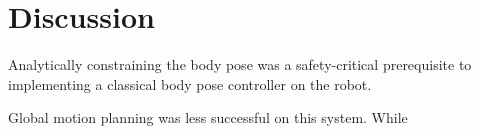 
\section{ Discussion }

Analytically constraining the body pose was a safety-critical prerequisite to implementing a classical body pose controller on the robot. 

Global motion planning was less successful on this system. While 


